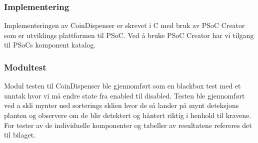 \documentclass[Rapport/Rapport_main.tex]{subfiles}
\begin{document}
\subsubsection{Implementering}
Implementeringen av CoinDispenser er skrevet i C med bruk av PSoC Creator som er utviklings plattformen til PSoC. Ved å bruke PSoC Creator har vi tilgang til PSoCs komponent katalog.
\subsubsection{Modultest}
Modul testen til CoinDispenser ble gjennomført som en blackbox test med et unntak hvor vi må endre state fra enabled til disabled. Testen ble gjennomført ved a skli mynter ned sorterings sklien hvor de så lander på mynt deteksjons planten og observere om de blir detektert og håntert riktig i henhold til kravene. For tester av de individuelle komponenter og tabeller av resultatene refereres det til bilaget.\\
\end{document}
